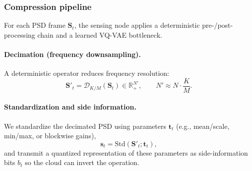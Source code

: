 \documentclass[11pt]{article}
\begin{document}
\begin{center}
{
}
\end{center}

\subsubsection{Compression pipeline}
For each PSD frame $\mathbf{S}_t$, the sensing node applies a deterministic pre-/post-processing chain and a learned VQ-VAE bottleneck.

\paragraph{Decimation (frequency downsampling).}
A deterministic operator reduces frequency resolution:
\begin{equation}
\mathbf{S}'_t = \mathcal{D}_{K/M}(\mathbf{S}_t)\in\mathbb{R}_+^{N'}, \qquad N' \approx N\cdot \frac{K}{M}.
\end{equation}

\paragraph{Standardization and side information.}
We standardize the decimated PSD using parameters $\mathbf{t}_t$ (e.g., mean/scale, min/max, or blockwise gains),
\begin{equation}
\mathbf{s}_t = \mathrm{Std}(\mathbf{S}'_t;\mathbf{t}_t),
\end{equation}
and transmit a quantized representation of these parameters as side-information bits $b_t$ so the cloud can invert the operation.
\end{document}
